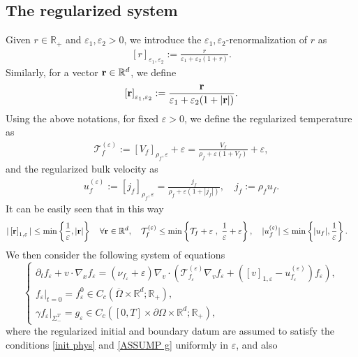 \documentclass[10pt, reqno]{amsart}
\theoremstyle{plain}
\theoremstyle{definition}
\theoremstyle{remark}
\numberwithin{equation}{section}
\newcommand{\bfr}{{\bf r}}
\newcommand{\calT}{\mathcal T}
\newcommand{\p}{\partial}
\newcommand{\R}{\mathbb{R}}
\newcommand{\ve}{\varepsilon}
\newcommand{\lt}{\left}
\newcommand{\rt}{\right}
\newcommand{\renorm}[3]{\lt[#1\rt]_{#2 , #3}}
\begin{document}
\subsection{The regularized system}\label{subsec: the regularized system}
Given $r\in \R_+$ and $\ve_1,\ve_2>0$, we introduce the $\ve_1,\ve_2$-renormalization of $r$ as
\begin{align*}
    \renorm{r}{\ve_1}{\ve_2} := \frac{r}{\ve_1 + \ve_2(1 + r)}. 
\end{align*}
Similarly, for a vector $\bfr\in \R^d$, we define
\begin{align*}
    \renorm{\bfr}{\ve_1}{\ve_2} := \frac{\bfr}{\ve_1 + \ve_2(1 + |\bfr|)}.
\end{align*}
Using the above notations, for fixed $\ve>0$, we define the regularized temperature as
\begin{align*}
    \calT^{(\ve)}_f := \renorm{V_f}{\rho_f}{\ve} + \ve = \frac{V_f}{\rho_f + \ve(1 + V_f)} + \ve,
\end{align*}
and the regularized bulk velocity as
\begin{align*}
    u_f^{(\ve)} := \renorm{j_f}{\rho_f}{\ve} = \frac{j_f}{\rho_f + \ve (1 + |j_f|)}, \quad j_f := \rho_f u_f.
\end{align*}
It can be easily seen that in this way
\begin{equation}\label{eq: reg major}
\begin{split}
    &|\renorm{\bfr}{1}{\ve}| \le \min\lt\{\frac{1}{\ve}, |\bfr| \rt\} \quad \forall \bfr\in \R^d,  \quad \calT_{f}^{(\ve)} \le \min\lt\{\calT_f + \ve\; , \; \frac{1}{\ve} + \ve \rt\}, \quad |u_f^{(\ve)}| \le \min\lt\{|u_f|, \frac{1}{\ve}\rt\}.
    \end{split}
\end{equation}
We then consider the following system of equations
\begin{equation}\label{eq: reg}
    \begin{cases}
        \p_t f_\ve + v\cdot \nabla_x f_\ve = \left(\nu_{f_\ve} +  \ve\right) \nabla_v\cdot \left( \calT_{f_\ve}^{(\ve)} \nabla_v f_\ve +  (\renorm{v}{1}{\ve} - u_{f_\ve}^{(\ve)}) f_\ve \right), \\
        f_\ve|_{t=0} = f_\ve^0 \in C_c(\overline{\Omega}\times\R^d;\R_+), \\
        \gamma f_{\ve}|_{\Sigma_-^T} = g_\ve \in C_c([0,T]\times \p\Omega \times \R^d; \R_+),
    \end{cases}
\end{equation}
where the regularized initial and boundary datum are assumed to satisfy the conditions \eqref{init phys} and \eqref{ASSUMP g} uniformly in $\ve$, and also
\end{document}
